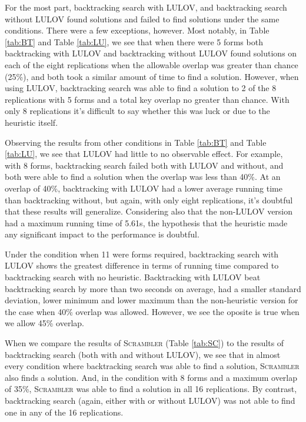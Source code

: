\documentclass[11pt]{article}
\begin{document}
\par
For the most part, backtracking search with LULOV, and backtracking
search without LULOV found solutions and failed to find solutions
under the same conditions. There were a few exceptions, however.  Most
notably, in Table \ref{tab:BT} and Table \ref{tab:LU}, we see that
when there were 5 forms both backtracking with LULOV and backtracking
without LULOV found solutions on each of the eight replications when
the allowable overlap was greater than chance (25\%), and both took a
similar amount of time to find a solution. However, when using LULOV,
backtracking search was able to find a solution to 2 of the 8
replications with 5 forms and a total key overlap no greater than
chance.  With only 8 replications it's difficult to say whether this
was luck or due to the heuristic itself.
\par
Observing the results from other conditions in Table \ref{tab:BT} and
Table \ref{tab:LU}, we see that LULOV had little to no observable
effect. For example, with 8 forms, backtracking search failed both
with LULOV and without, and both were able to find a solution when the
overlap was less than 40\%.  At an overlap of 40\%, backtracking with
LULOV had a lower average running time than backtracking without, but
again, with only eight replications, it's doubtful that these results
will generalize.  Considering also that the non-LULOV version had a
maximum running time of 5.61s, the hypothesis that the heuristic made
any significant impact to the performance is doubtful.
\par
Under the condition when 11 were forms required, backtracking search
with LULOV shows the greatest difference in terms of running time
compared to backtracking search with no heuristic. Backtracking with
LULOV beat backtracking search by more than two seconds on average,
had a smaller standard deviation, lower minimum and lower maximum than
the non-heuristic version for the case when 40\% overlap was
allowed. However, we see the oposite is true when we allow 45\%
overlap.
\par
When we compare the results of \textsc{Scrambler} (Table \ref{tab:SC})
to the results of backtracking search (both with and without LULOV),
we see that in almost every condition where backtracking search was
able to find a solution, \textsc{Scrambler} also finds a
solution. And, in the condition with 8 forms and a maximum overlap of
35\%, \textsc{Scrambler} was able to find a solution in all 16
replications. By contrast, backtracking search (again, either with or
without LULOV) was not able to find one in any of the 16 replications.
\end{document}
